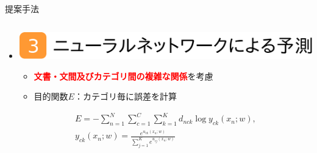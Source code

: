 \documentclass[unicode,10pt]{beamer}
\newlength{\mycolumnwidth}
\newlength{\mytitlefigureheight}
\newcommand{\itemtitle}[1]{\textbf{#1}\\}
\newcommand{\fire}[1]{\textcolor{red}{\textbf{#1}}}
\newcommand{\doublecolumns}[4]{
    \begin{minipage}[t]{#1}
      #2
    \end{minipage}
    \begin{minipage}[t]{#3}
      #4
    \end{minipage}}
\begin{document}
\begin{frame}[t]
\begin{block}{提案手法}
\begin{columns}[onlytextwidth,t]
\begin{column}{\mycolumnwidth}
\begin{itemize}
        \item \itemtitle{\includegraphics[height=\mytitlefigureheight]
                                         {fig/poster_model_title_3.pdf}}
            \begin{itemize}
              \item \fire{文書・文間及びカテゴリ間の複雑な関係}を考慮
              \item 目的関数$E$：カテゴリ毎に誤差を計算
            \end{itemize}
          \doublecolumns{0.6\linewidth}{
            \vspace{-1.5em} %
            \begin{gather*}
              E = - \sum^{N}_{n = 1} \sum^{C}_{c = 1} \sum^{K}_{k = 1}
                    d_{nck} \log{y_{ck}(x_n; w)},
              \label{eq:NNObjective} \\
              y_{ck}(x_n; w) = \frac{e^{u_{ck}(x_n; w)}}
                                    {\sum^{K}_{j = 1} e^{u_{cj}(x_n; w)}}%
              \nonumber \\
            \end{gather*}
          }{0.375\linewidth}{
            \small
}
\end{itemize}
\end{column}
\end{columns}
\end{block}
\end{frame}
\end{document}
